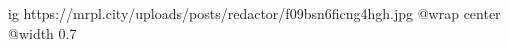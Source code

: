 
 
 
 
 

\ifcmt
  ig https://mrpl.city/uploads/posts/redactor/f09bsn6ficng4hgh.jpg
  @wrap center
  @width 0.7
\fi
